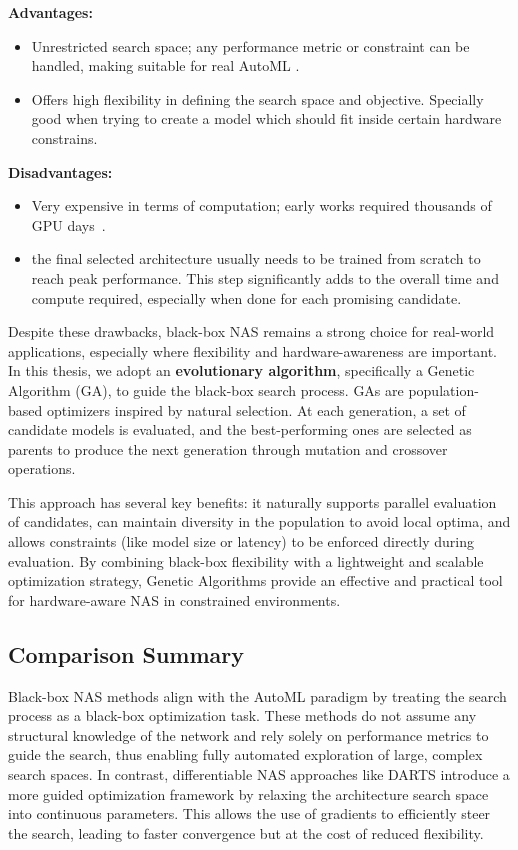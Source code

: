 \textbf{Advantages:} 
\begin{itemize}
    \item Unrestricted search space; any performance metric or constraint can be handled, making suitable for real AutoML \cite{burrello2023enhancing}.
    \item Offers high flexibility in defining the search space and objective. Specially good when trying to create a model which should fit inside certain hardware constrains.
\end{itemize}

\textbf{Disadvantages:}
\begin{itemize}
    \item Very expensive in terms of computation; early works required thousands of GPU days~\cite{liu2018darts}.
    \item the final selected architecture usually needs to be trained from scratch to reach peak performance. This step significantly adds to the overall time and compute required, especially when done for each promising candidate. 
\end{itemize}

Despite these drawbacks, black-box NAS remains a strong choice for real-world applications, especially where flexibility and hardware-awareness are important. In this thesis, we adopt an \textbf{evolutionary algorithm}, specifically a Genetic Algorithm (GA), to guide the black-box search process. GAs are population-based optimizers inspired by natural selection. At each generation, a set of candidate models is evaluated, and the best-performing ones are selected as parents to produce the next generation through mutation and crossover operations.

This approach has several key benefits: it naturally supports parallel evaluation of candidates, can maintain diversity in the population to avoid local optima, and allows constraints (like model size or latency) to be enforced directly during evaluation. By combining black-box flexibility with a lightweight and scalable optimization strategy, Genetic Algorithms provide an effective and practical tool for hardware-aware NAS in constrained environments.


\subsection{Comparison Summary}
Black-box NAS methods align with the AutoML paradigm by treating the search process as a black-box optimization task. These methods do not assume any structural knowledge of the network and rely solely on performance metrics to guide the search, thus enabling fully automated exploration of large, complex search spaces. In contrast, differentiable NAS approaches like DARTS introduce a more guided optimization framework by relaxing the architecture search space into continuous parameters. This allows the use of gradients to efficiently steer the search, leading to faster convergence but at the cost of reduced flexibility.

